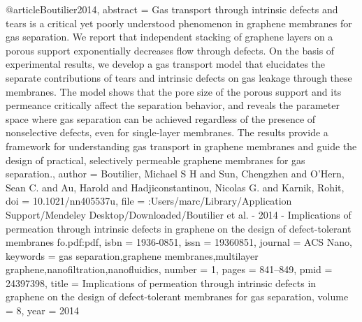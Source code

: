 @article{Boutilier2014,
abstract = {Gas transport through intrinsic defects and tears is a critical yet poorly understood phenomenon in graphene membranes for gas separation. We report that independent stacking of graphene layers on a porous support exponentially decreases flow through defects. On the basis of experimental results, we develop a gas transport model that elucidates the separate contributions of tears and intrinsic defects on gas leakage through these membranes. The model shows that the pore size of the porous support and its permeance critically affect the separation behavior, and reveals the parameter space where gas separation can be achieved regardless of the presence of nonselective defects, even for single-layer membranes. The results provide a framework for understanding gas transport in graphene membranes and guide the design of practical, selectively permeable graphene membranes for gas separation.},
author = {Boutilier, Michael S H and Sun, Chengzhen and O'Hern, Sean C. and Au, Harold and Hadjiconstantinou, Nicolas G. and Karnik, Rohit},
doi = {10.1021/nn405537u},
file = {:Users/marc/Library/Application Support/Mendeley Desktop/Downloaded/Boutilier et al. - 2014 - Implications of permeation through intrinsic defects in graphene on the design of defect-tolerant membranes fo.pdf:pdf},
isbn = {1936-0851},
issn = {19360851},
journal = {ACS Nano},
keywords = {gas separation,graphene membranes,multilayer graphene,nanofiltration,nanofluidics},
number = {1},
pages = {841--849},
pmid = {24397398},
title = {{Implications of permeation through intrinsic defects in graphene on the design of defect-tolerant membranes for gas separation}},
volume = {8},
year = {2014}
}
